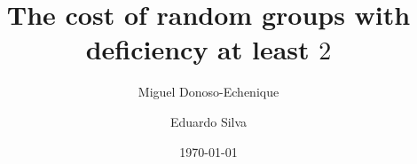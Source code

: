 \documentclass[reqno,oneside,11pt]{amsart}
\author{Miguel Donoso-Echenique}
\author{Eduardo Silva}
\title[]{The cost of random groups with deficiency at least $2$}
\date{\today}
\begin{document}
	
	\begin{abstract}
	\end{abstract}
	
	\maketitle








\end{document}
